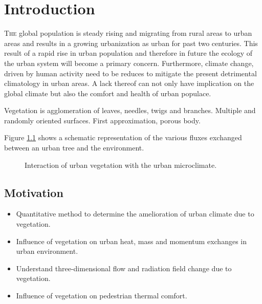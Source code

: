 \chapter{Introduction}
\label{ch:introduction}

\def\figdir{chapters/introduction/figures/}


%		


\lettrine[lines=3,nindent=0em,loversize=0.1]{T}{he} global population is steady rising and migrating from rural areas to urban areas and results in a growing urbanization as urban for past two centuries. This result of a rapid rise in urban population and therefore in future the ecology of the urban system will become a primary concern. Furthermore, climate change, driven by human activity need to be reduces to mitigate the present detrimental climatology in urban areas. A lack thereof can not only have implication on the global climate but also the comfort and health of urban populace. 

Vegetation is agglomeration of leaves, needles, twigs and branches. Multiple and randomly oriented surfaces. First approximation, porous body. 


 Figure \ref{fig:vegetation_fluxes} shows a schematic representation of the various fluxes exchanged between an urban tree and the environment. 

\begin{figure}[h]
	\centering
	\caption{Interaction of urban vegetation with the urban microclimate.}
	\label{fig:vegetation_fluxes}
\end{figure}	

\section{Motivation}


\begin{itemize}
	\item Quantitative method to determine the amelioration of urban climate due to vegetation.
	\item Influence of vegetation on urban heat, mass and momentum exchanges in urban environment.
	\item Understand three-dimensional flow and radiation field change due to vegetation.
	\item Influence of vegetation on pedestrian thermal comfort. 
\end{itemize}

